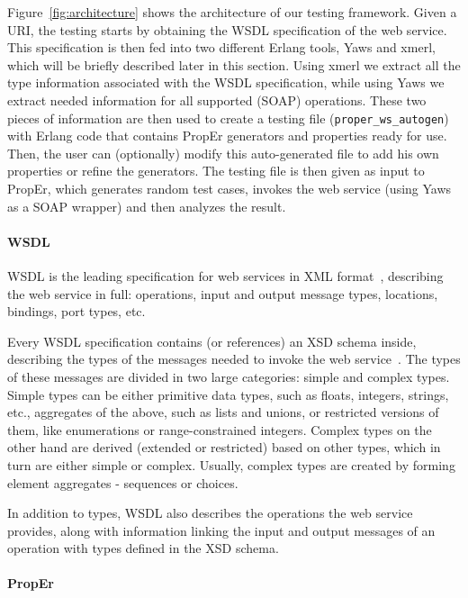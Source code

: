 \documentclass[copyright]{eptcs}
\begin{document}
Figure~\ref{fig:architecture} shows the architecture of our testing
framework. Given a URI, the testing starts by obtaining the WSDL
specification of the web service. This specification is then fed into
two different Erlang tools, Yaws and xmerl, which will be briefly
described later in this section. Using xmerl we extract all the type
information associated with the WSDL specification, while using Yaws
we extract needed information for all supported (SOAP) operations.
These two pieces of information are then used to create a testing file
(\texttt{proper\_ws\_autogen}) with Erlang code that contains PropEr
generators and properties ready for use. Then, the user can
(optionally) modify this auto-generated file to add his own properties
or refine the generators. The testing file is then given as input to
PropEr, which generates random test cases, invokes the web service
(using Yaws as a SOAP wrapper) and then analyzes the result.

\paragraph{WSDL}

WSDL is the leading specification for web services in XML
format~\cite{wsdl_spec}, describing the web service in full:
operations, input and output message types, locations, bindings, port
types, etc.

Every WSDL specification contains (or references) an XSD schema
inside, describing the types of the messages needed to invoke the web
service~\cite{xsd_structure_spec,xsd_datatypes_spec}. The types of
these messages are divided in two large categories: simple and complex
types. Simple types can be either primitive data types, such as
floats, integers, strings, etc., aggregates of the above, such as
lists and unions, or restricted versions of them, like enumerations or
range-constrained integers. Complex types on the other hand are
derived (extended or restricted) based on other types, which in turn
are either simple or complex. Usually, complex types are created by
forming element aggregates - sequences or choices.

In addition to types, WSDL also describes the operations the web
service provides, along with information linking the input and output
messages of an operation with types defined in the XSD schema.

\paragraph{PropEr}
\end{document}
